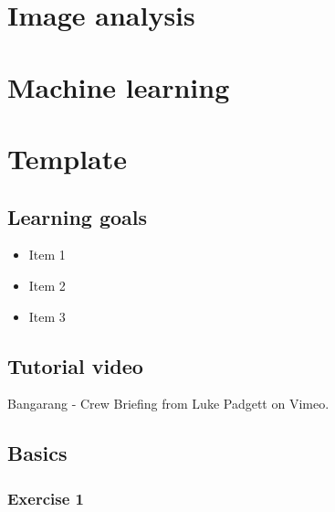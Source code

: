 \documentclass[
]{book}
\providecommand{\tightlist}{%
  \setlength{\itemsep}{0pt}\setlength{\parskip}{0pt}}
\begin{document}
\hypertarget{image-analysis}{%
\chapter{Image analysis}\label{image-analysis}}

\hypertarget{machine-learning}{%
\chapter{Machine learning}\label{machine-learning}}

\hypertarget{template}{%
\chapter{Template}\label{template}}

\hypertarget{learning-goals-5}{%
\section*{Learning goals}\label{learning-goals-5}}

\begin{itemize}
\tightlist
\item
  Item 1\\
\item
  Item 2\\
\item
  Item 3
\end{itemize}

\hypertarget{tutorial-video-5}{%
\section*{Tutorial video}\label{tutorial-video-5}}

Bangarang - Crew Briefing from Luke Padgett on Vimeo.

\hypertarget{basics-1}{%
\section*{Basics}\label{basics-1}}

\hypertarget{exercise-1-3}{%
\subsection*{Exercise 1}\label{exercise-1-3}}
\end{document}
